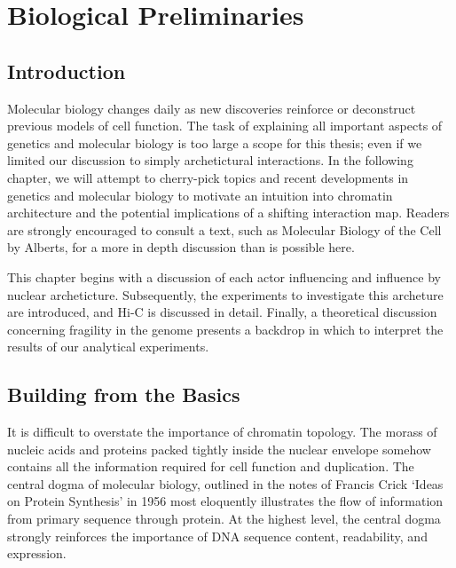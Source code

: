 
\chapter{Biological Preliminaries}

\section*{Introduction}

Molecular biology changes daily as new discoveries reinforce or deconstruct previous models of cell function.  The task of
explaining all important aspects of genetics and molecular biology is too large a scope for this thesis; even if we limited
our discussion to simply archetictural interactions.  In the following chapter, we will attempt to cherry-pick topics and recent
developments in genetics and molecular biology to motivate an intuition into chromatin architecture and the potential implications
of a shifting interaction map.  Readers are strongly encouraged to consult a text, such as Molecular Biology of the Cell by
Alberts\cite{alberts2002}, for a more in depth discussion than is possible here.

This chapter begins with a discussion of each actor influencing and influence by nuclear archeticture.  Subsequently, the experiments
to investigate this archeture are introduced, and Hi-C is discussed in detail.  Finally, a theoretical discussion concerning
fragility in the genome presents a backdrop in which to interpret the results of our analytical experiments.


\section*{Building from the Basics}

It is difficult to overstate the importance of chromatin topology.  The morass of nucleic acids and proteins packed tightly inside the
nuclear envelope somehow contains all the information required for cell function and duplication.  The central dogma of molecular biology,
outlined in the notes of Francis Crick `Ideas on Protein Synthesis' in 1956\cite{crick1970} most eloquently illustrates the flow of
information from primary sequence through protein.  At the highest level, the central dogma strongly reinforces the importance of
\gls{DNA} sequence content, readability, and expression.

\begin{figure}[ht]
\end{figure}

